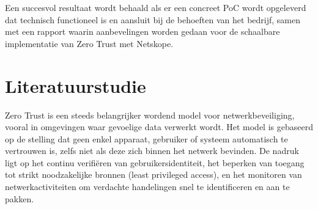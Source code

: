 Een succesvol resultaat wordt behaald als er een concreet PoC wordt opgeleverd dat technisch functioneel is en aansluit bij de behoeften van het bedrijf, samen met een rapport waarin aanbevelingen worden gedaan voor de schaalbare implementatie van Zero Trust met Netskope.






\section{Literatuurstudie}%
\label{sec:literatuurstudie}

Zero Trust is een steeds belangrijker wordend model voor netwerkbeveiliging, vooral in omgevingen waar gevoelige data verwerkt wordt. 
Het model is gebaseerd op de stelling dat geen enkel apparaat, gebruiker of systeem automatisch te vertrouwen is, zelfs niet als deze zich binnen het netwerk bevinden. 
De nadruk ligt op het continu verifiëren van gebruikersidentiteit, het beperken van toegang tot strikt noodzakelijke bronnen (least privileged access), en het monitoren van netwerkactiviteiten om verdachte handelingen snel te identificeren en aan te pakken.

